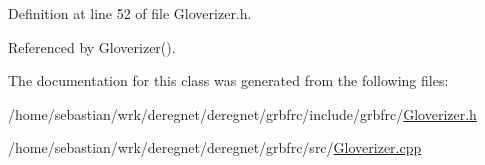 Definition at line 52 of file Gloverizer.\+h.



Referenced by Gloverizer().



The documentation for this class was generated from the following files\+:\begin{DoxyCompactItemize}
\item 
/home/sebastian/wrk/deregnet/deregnet/grbfrc/include/grbfrc/\hyperlink{Gloverizer_8h}{Gloverizer.\+h}\item 
/home/sebastian/wrk/deregnet/deregnet/grbfrc/src/\hyperlink{Gloverizer_8cpp}{Gloverizer.\+cpp}\end{DoxyCompactItemize}
